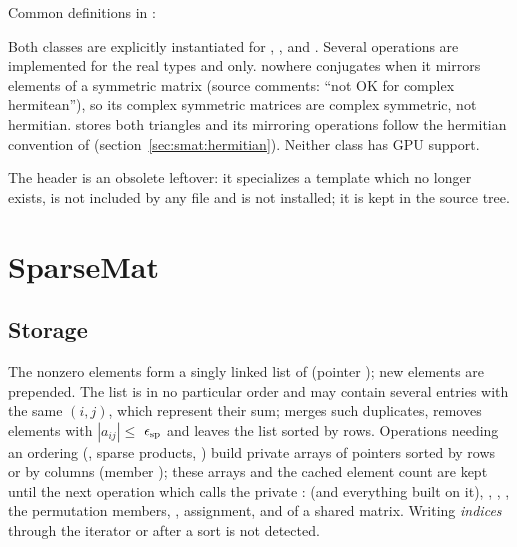 Common definitions in :
\begin{lareference}
\end{lareference}
Both classes are explicitly instantiated for , ,  and .
Several operations are implemented for the real types  and  only.  nowhere conjugates when
it mirrors elements of a symmetric matrix (source comments: ``not OK for complex hermitean''), so
its complex symmetric matrices are complex symmetric, not hermitian.  stores both triangles
and its mirroring operations follow the hermitian convention of  (section~\ref{sec:smat:hermitian}).
Neither class has GPU support.

The header  is an obsolete leftover: it specializes a template 
which no longer exists, is not included by any file and is not installed; it is kept in the source tree.

\section{SparseMat}\label{sec:sparse:sparsemat}

\subsection{Storage}\label{sec:sparse:storage}
The nonzero elements form a singly linked list of  (pointer ); new elements are
prepended. The list is in no particular order and may contain several entries with the same
$(i,j)$, which represent their sum;  merges such duplicates, removes elements with
$|a_{ij}|\le$ $\epsilon_{\rm sp}$ and leaves the list sorted by rows. Operations needing an ordering
(, sparse products, ) build private arrays of pointers sorted by rows or by columns
(member ); these arrays and the cached element count  are kept until the next
operation which calls the private :  (and everything built on it), ,
, , the permutation members, , assignment, and  of a
shared matrix. Writing \emph{indices} through the iterator or  after a sort is not detected.

